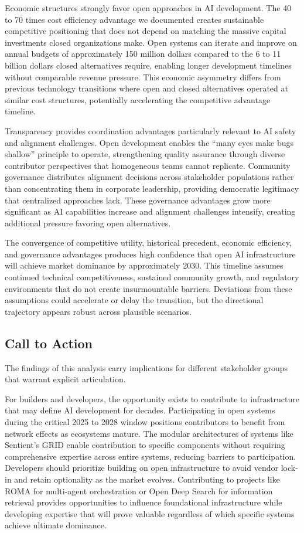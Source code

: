 Economic structures strongly favor open approaches in AI development. The 40 to 70 times cost efficiency advantage we documented creates sustainable competitive positioning that does not depend on matching the massive capital investments closed organizations make. Open systems can iterate and improve on annual budgets of approximately 150 million dollars compared to the 6 to 11 billion dollars closed alternatives require, enabling longer development timelines without comparable revenue pressure. This economic asymmetry differs from previous technology transitions where open and closed alternatives operated at similar cost structures, potentially accelerating the competitive advantage timeline.

Transparency provides coordination advantages particularly relevant to AI safety and alignment challenges. Open development enables the ``many eyes make bugs shallow'' principle to operate, strengthening quality assurance through diverse contributor perspectives that homogeneous teams cannot replicate. Community governance distributes alignment decisions across stakeholder populations rather than concentrating them in corporate leadership, providing democratic legitimacy that centralized approaches lack. These governance advantages grow more significant as AI capabilities increase and alignment challenges intensify, creating additional pressure favoring open alternatives.

The convergence of competitive utility, historical precedent, economic efficiency, and governance advantages produces high confidence that open AI infrastructure will achieve market dominance by approximately 2030. This timeline assumes continued technical competitiveness, sustained community growth, and regulatory environments that do not create insurmountable barriers. Deviations from these assumptions could accelerate or delay the transition, but the directional trajectory appears robust across plausible scenarios.

\subsection{Call to Action}

The findings of this analysis carry implications for different stakeholder groups that warrant explicit articulation.

For builders and developers, the opportunity exists to contribute to infrastructure that may define AI development for decades. Participating in open systems during the critical 2025 to 2028 window positions contributors to benefit from network effects as ecosystems mature. The modular architectures of systems like Sentient's GRID enable contribution to specific components without requiring comprehensive expertise across entire systems, reducing barriers to participation. Developers should prioritize building on open infrastructure to avoid vendor lock-in and retain optionality as the market evolves. Contributing to projects like ROMA for multi-agent orchestration or Open Deep Search for information retrieval provides opportunities to influence foundational infrastructure while developing expertise that will prove valuable regardless of which specific systems achieve ultimate dominance.

